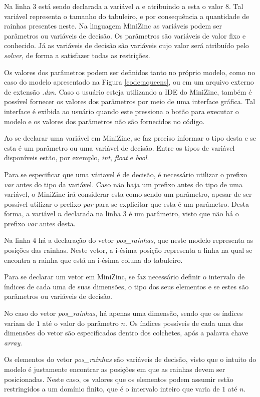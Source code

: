 Na linha 3 está sendo declarada a variável $n$ e atribuindo a esta o valor $8$. Tal variável representa o tamanho do tabuleiro, e por consequência a quantidade de rainhas presentes neste. Na linguagem MiniZinc as variáveis podem ser parâmetros ou variáveis de decisão. Os parâmetros são variáveis de valor fixo e conhecido. Já as variáveis de decisão são variáveis cujo valor será atribuído pelo \textit{solver}, de forma a satisfazer todas as restrições.

Os valores dos parâmetros podem ser definidos tanto no próprio modelo, como no caso do modelo apresentado na Figura \ref{code:nqueens}, ou em um arquivo externo de extensão \textit{.dzn}. Caso o usuário esteja utilizando a IDE do MiniZinc, também é possível fornecer os valores dos parâmetros por meio de uma interface gráfica. Tal interface é exibida ao usuário quando este pressiona o botão para executar o modelo e os valores dos parâmetros não são fornecidos no código.

Ao se declarar uma variável em MiniZinc, se faz preciso informar o tipo desta e se esta é um parâmetro ou uma variável de decisão. Entre os tipos de variável disponíveis estão, por exemplo, \textit{int}, \textit{float} e \textit{bool}.

Para se especificar que uma váriavel é de decisão, é necessário utilizar o prefixo \textit{var} antes do tipo da variável. Caso não haja um prefixo antes do tipo de uma variável, o MiniZinc irá considerar esta como sendo um parâmetro, apesar de ser possível utilizar o prefixo \textit{par} para se explicitar que esta é um parâmetro. Desta forma, a variável $n$ declarada na linha 3 é um parâmetro, visto que não há o prefixo \textit{var} antes desta.

Na linha 4 há a declaração do vetor \textit{pos\_rainhas}, que neste modelo representa as posições das rainhas. Neste vetor, a i-ésima posição representa a linha na qual se encontra a rainha que está na i-ésima coluna do tabuleiro.
  
Para se declarar um vetor em MiniZinc, se faz necessário definir o intervalo de índices de cada uma de suas dimensões, o tipo dos seus elementos e se estes são parâmetros ou variáveis de decisão.

No caso do vetor \textit{pos\_rainhas}, há apenas uma dimensão, sendo que os índices variam de $1$ até o valor do parâmetro $n$. Os índices possíveis de cada uma das dimensões do vetor são especificados dentro dos colchetes, após a palavra chave \textit{array}.

Os elementos do vetor \textit{pos\_rainhas} são variáveis de decisão, visto que o intuito do modelo é justamente encontrar as posições em que as rainhas devem ser posicionadas. Neste caso, os valores que os elementos podem assumir estão restringidos a um domínio finito, que é o intervalo inteiro que varia de $1$ até $n$.

